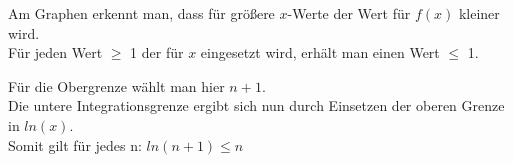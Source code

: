 \documentclass[a4paper,11pt,fleqn]{scrartcl}
\begin{document}
\begin{enumerate}
\begin{enumerate}
                Am Graphen erkennt man, dass für größere $x$-Werte der Wert für $f(x)$ kleiner wird. \\
                Für jeden Wert $\geq$ 1 der für $x$ eingesetzt wird, erhält man einen Wert $\leq$ 1. 

                Für die Obergrenze wählt man hier $n+1$. \\ Die untere Integrationsgrenze ergibt sich nun durch Einsetzen der oberen Grenze in $ln(x)$.\\
               Somit gilt für jedes n: $ln(n+1) \leq n$\\
               


            \end{enumerate}
            \end{enumerate}
                
\end{document}
